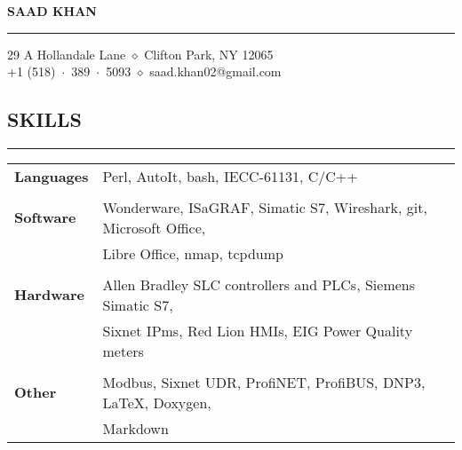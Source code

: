 \documentclass{article}
\begin{document}
%
\begin{center}
    {\MakeUppercase{\huge\bf Saad Khan}} \\
    \bigskip
    \hrule
    \bigskip
    29 A Hollandale Lane $\diamond$ Clifton Park, NY 12065 \\
    +1 (518)~$\cdot$~389~$\cdot$~5093 $\diamond$ saad.khan02@gmail.com \\
    \bigskip
\end{center}

%
\subsection*{\MakeUppercase{\bf Skills}}
    \hrule
    \bigskip
    \begin{tabular}{l l}
    {\bfseries Languages} &
    Perl, AutoIt, bash, IECC-61131, C/C++\\
    \\
    {\bfseries Software} &
    Wonderware, ISaGRAF, Simatic S7, Wireshark, git, Microsoft Office,\\
    &
    Libre Office, nmap, tcpdump \\
    \\
    {\bfseries Hardware} &
    Allen Bradley SLC controllers and PLCs, Siemens Simatic S7,\\
    &
    Sixnet IPms, Red Lion HMIs, EIG Power Quality meters \\
    \\
    {\bfseries Other} &
    Modbus, Sixnet UDR, ProfiNET, ProfiBUS, DNP3, \LaTeX, Doxygen, \\
    &
    Markdown \\
    \end{tabular}
    \bigskip

%
\end{document}
